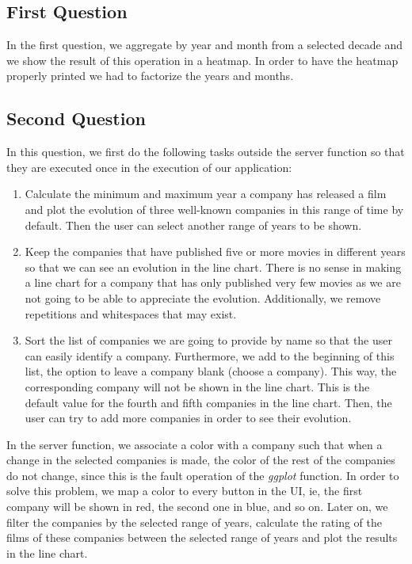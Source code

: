 \subsection{First Question}
In the first question, we aggregate by year and month from a selected decade and we show the result of this operation in a heatmap. In order to have the heatmap properly printed we had to factorize the years and months.

\subsection{Second Question}
In this question, we first do the following tasks outside the server function so that they are executed once in the execution of our application:

\begin{enumerate}
	\item Calculate the minimum and maximum year a company has released a film and plot the evolution of three well-known companies in this range of time by default. Then the user can select another range of years to be shown.
	\item Keep the companies that have published five or more movies in different years so that we can see an evolution in the line chart. There is no sense in making a line chart for a company that has only published very few movies as we are not going to be able to appreciate the evolution. Additionally, we remove repetitions and whitespaces that may exist.
	\item Sort the list of companies we are going to provide by name so that the user can easily identify a company. Furthermore, we add to the beginning of this list, the option to leave a company blank (choose a company). This way, the corresponding company will not be shown in the line chart. This is the default value for the fourth and fifth companies in the line chart. Then, the user can try to add more companies in order to see their evolution.
\end{enumerate}

In the server function, we associate a color with a company such that when a change in the selected companies is made, the color of the rest of the companies do not change, since this is the fault operation of the \textit{ggplot} function. In order to solve this problem, we map a color to every button in the UI, ie, the first company will be shown in red, the second one in blue, and so on. Later on, we filter the companies by the selected range of years, calculate the rating of the films of these companies between the selected range of years and plot the results in the line chart.

